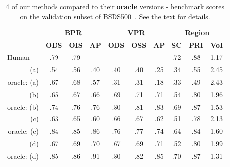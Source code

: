 \begin{table}[htbp]
\renewcommand{\arraystretch}{1.3}
\centering
\scriptsize
\begin{tabular}{l|c|c|c||c|c|c||c|c|c|}
\cline{2-10} %
\multirow{2}{*}{} & \multicolumn{3}{c||}{\textbf{BPR}} & \multicolumn{3}{c||}{\textbf{VPR}}& \multicolumn{3}{c|}{\textbf{Region}}\\
\cline{2-10}
& \textbf{ODS}  & \textbf{OIS} & \textbf{AP} %
& \textbf{ODS} & \textbf{OSS} & \textbf{AP} %
& \textbf{SC} & \textbf{PRI} & \textbf{VoI} \\
\hline
\multicolumn{1}{|l|}{Human} & .79 & .79 & - & - & - & - & .72 & .88 & 1.17 \\ %
\hline
\multicolumn{1}{|r|}{(a)} & .54 & .56 & .40 & .40 & .40 & .25 & .34 & .55 & 2.45 \\
\multicolumn{1}{|r|}{oracle: (a)} & .67 & .68 & .57 & .31 & .31 & .18 & .33 & .49 & 2.43 \\
\multicolumn{1}{|r|}{(b)} & .65 & .67 & .66 & .69 & .71 & .71 & .54 & .80 & 1.96 \\
\multicolumn{1}{|r|}{oracle: (b)} & .74 & .76 & .76 & .80 & .81 & .83 & .69 & .87 & 1.53 \\
\multicolumn{1}{|r|}{(c)} & .63 & .65 & .60 & .66 & .67 & .62 & .51 & .78 & 2.13 \\
\multicolumn{1}{|r|}{oracle: (c)} & .84 & .85 & .86 & .76 & .77 & .74 & .64 & .84 & 1.60 \\
\multicolumn{1}{|r|}{(d)} & .67 & .69 & .70 & .67 & .69 & .71 & .52 & .80 & 1.99 \\
\multicolumn{1}{|r|}{oracle: (d)} & .85 & .86 & .91 & .80 & .82 & .85 & .70 & .87 & 1.31 \\
\hline
\end{tabular}
\caption[4 of our methods compared to their oracle versions]{4 of our methods compared to their {\bf oracle} versions - benchmark scores on the validation subset of BSDS500~\cite{BSDS500resources}. See the text for details.}
\label{tab:oracle}
\end{table}

